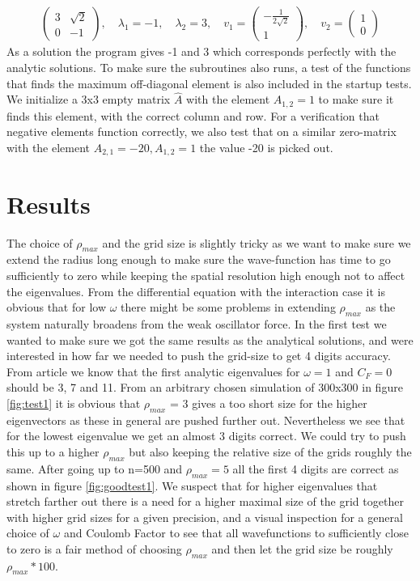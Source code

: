 \documentclass[a4paper,11pt]{article}
\begin{document}
{\begin{align}
\begin{pmatrix}
3 & \sqrt{2} \\
0 & -1 
\end{pmatrix}
, \quad \lambda_1 = -1, \quad \lambda_2 = 3, \quad v_1 = \begin{pmatrix}
-\frac{1}{2\sqrt{2}} \\
1
\end{pmatrix}, \quad v_2 = \begin{pmatrix}
1 \\
0
\end{pmatrix}
\end{align}
As a solution the program gives -1 and 3 which corresponds perfectly with the analytic solutions. To make sure the subroutines also runs, a test of the functions that finds the maximum off-diagonal element is also included in the startup tests. We initialize a 3x3 empty matrix $\hat{A}$ with the element $A_{1,2}=1$ to make sure it finds this element, with the correct column and row. For a verification that negative elements function correctly, we also test that on a similar zero-matrix with the element $A_{2,1}=-20, A_{1,2}=1$ the value -20 is picked out. 






\section*{Results}
The choice of $\rho_{max}$ and the grid size is slightly tricky as we want to make sure we extend the radius long enough to make sure the wave-function has time to go sufficiently to zero while keeping the spatial resolution high enough not to affect the eigenvalues. From the differential equation with the interaction case it is obvious that for low $\omega$ there might be some problems in extending $\rho_{max}$ as the system naturally broadens from the weak oscillator force. In the first test we wanted to make sure we got the same results as the analytical solutions, and were interested in how far we needed to push the grid-size to get 4 digits accuracy. From  article\cite{two_electorn_analysis} we know that the first analytic eigenvalues for $\omega = 1$ and $C_F=0$ should be 3, 7 and 11.  From an arbitrary chosen simulation of 300x300 in figure \ref{fig:test1} it is obvious that $\rho_{max}$ = 3 gives a too short size for the higher eigenvectors as these in general are pushed further out. Nevertheless we see that for the lowest eigenvalue we get an almost 3 digits correct. We could try to push this up to a higher $\rho_{max}$ but also keeping the relative size of the grids roughly the same.  After going up to n=500 and $\rho_{max}=5$ all the first 4 digits are correct as shown in figure \ref{fig:goodtest1}. We suspect that for higher eigenvalues that stretch farther out there is a need for a higher maximal size of the grid together with higher grid sizes for a given precision, and a visual inspection for a general choice of $\omega$ and Coulomb Factor to see that all wavefunctions to sufficiently close to zero is a fair method of choosing $\rho_{max}$ and then let the grid size be roughly $\rho_{max}*100$. 

}
\end{document}
